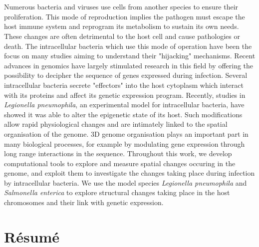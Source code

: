 %
\chapter*{\abstractname}
\label{sec:abstract}
\vspace*{-10mm}

Numerous bacteria and viruses use cells from another species to ensure their proliferation. This mode of reproduction implies the pathogen must escape the host immune system and reprogram its metabolism to sustain its own needs. These changes are often detrimental to the host cell and cause pathologies or death. The intracellular bacteria which use this mode of operation have been the focus on many studies aiming to understand their "hijacking" mechanisms. Recent advances in genomics have largely stimulated research in this field by offering the possibility to decipher the sequence of genes expressed during infection. Several intracellular bacteria secrete "effectors" into the host cytoplasm which interact with its proteins and affect its genetic expression program. Recently, studies in \textit{Legionella pneumophila}, an experimental model for intracellular bacteria, have showed it was able to alter the epigenetic state of its host. Such modifications allow rapid physiological changes and are intimately linked to the spatial organisation of the genome. 3D genome organisation plays an important part in many biological processes, for example by modulating gene expression through long range interactions in the sequence. Throughout this work, we develop computational tools to explore and measure spatial changes occuring in the genome, and exploit them to investigate the changes taking place during infection by intracellular bacteria. We use the model species \textit{Legionella pneumophila} and \textit{Salmonella enterica} to explore structural changes taking place in the host chromosomes and their link with genetic expression.

\vspace*{20mm}

\chapter*{Résumé}
\label{sec:abstract-diff}

